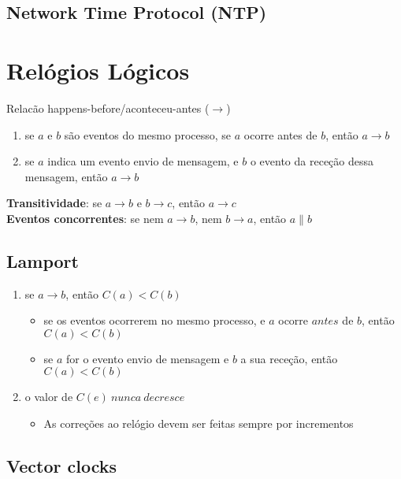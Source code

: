 \documentclass[12pt]{article}
\begin{document}
\subsection{Network Time Protocol (NTP)}

\newpage

\section{Relógios Lógicos}

Relacão happens-before/aconteceu-antes ($\rightarrow$)

\begin{enumerate}
    \item se $a$ e $b$ são eventos do mesmo processo, se $a$ ocorre antes de $b$, então $a \rightarrow b$
    \item se $a$ indica um evento envio de mensagem, e $b$ o evento da receção dessa mensagem, então $a \rightarrow b$
\end{enumerate}

\textbf{Transitividade}: se $a \rightarrow b$ e $b \rightarrow c$, então $a \rightarrow c$ \\
\textbf{Eventos concorrentes}: se nem $a \rightarrow b$, nem $b \rightarrow a$, então $a \parallel b$

\subsection{Lamport}

\begin{enumerate}
    \item se $a \rightarrow b$, então $C(a) < C(b)$
    \begin{itemize}[topsep=0pt]
        \item se os eventos ocorrerem no mesmo processo, e $a$ ocorre $antes$ de $b$, então $C(a) < C(b)$
        \item se $a$ for o evento envio de mensagem e $b$ a sua receção, então $C(a) < C(b)$
    \end{itemize}
    \item o valor de $C(e)\ nunca\ decresce$
    \begin{itemize}[topsep=0pt]
        \item As correções ao relógio devem ser feitas sempre por incrementos
    \end{itemize}
\end{enumerate}

\subsection{Vector clocks}
\end{document}
